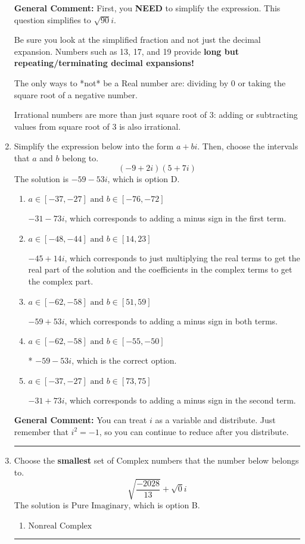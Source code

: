 \documentclass{extbook}[14pt]
\newcommand{\litem}[1]{\item #1

\rule{\textwidth}{0.4pt}}
\begin{document}
\begin{enumerate}
{\textbf{General Comment:} First, you \textbf{NEED} to simplify the expression. This question simplifies to $\sqrt{90} i$. 
 
 Be sure you look at the simplified fraction and not just the decimal expansion. Numbers such as 13, 17, and 19 provide \textbf{long but repeating/terminating decimal expansions!} 
 
 The only ways to *not* be a Real number are: dividing by 0 or taking the square root of a negative number. 
 
 Irrational numbers are more than just square root of 3: adding or subtracting values from square root of 3 is also irrational.
}
\litem{
Simplify the expression below into the form $a+bi$. Then, choose the intervals that $a$ and $b$ belong to.
\[ (-9 + 2 i)(5 + 7 i) \]The solution is \( -59 - 53 i \), which is option D.\begin{enumerate}[label=\Alph*.]
\item \( a \in [-37, -27] \text{ and } b \in [-76, -72] \)

 $-31 - 73 i$, which corresponds to adding a minus sign in the first term.
\item \( a \in [-48, -44] \text{ and } b \in [14, 23] \)

 $-45 + 14 i$, which corresponds to just multiplying the real terms to get the real part of the solution and the coefficients in the complex terms to get the complex part.
\item \( a \in [-62, -58] \text{ and } b \in [51, 59] \)

 $-59 + 53 i$, which corresponds to adding a minus sign in both terms.
\item \( a \in [-62, -58] \text{ and } b \in [-55, -50] \)

* $-59 - 53 i$, which is the correct option.
\item \( a \in [-37, -27] \text{ and } b \in [73, 75] \)

 $-31 + 73 i$, which corresponds to adding a minus sign in the second term.
\end{enumerate}

\textbf{General Comment:} You can treat $i$ as a variable and distribute. Just remember that $i^2=-1$, so you can continue to reduce after you distribute.
}
\litem{
Choose the \textbf{smallest} set of Complex numbers that the number below belongs to.
\[ \sqrt{\frac{-2028}{13}}+\sqrt{0}i \]The solution is \( \text{Pure Imaginary} \), which is option B.\begin{enumerate}[label=\Alph*.]
\item \( \text{Nonreal Complex} \)


\end{enumerate}}
\end{enumerate}
\end{document}
